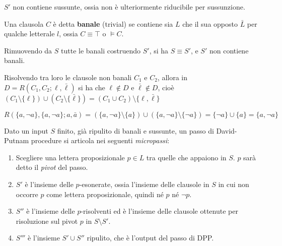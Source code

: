 \begin{oss}
        $S'$ non contiene sussunte, ossia non è ulteriormente riducibile 
        per sussunzione.
\end{oss}

\begin{defi}
        Una clausola $C$ è detta \textbf{banale} (trivial) se contiene 
        sia $L$ che  il sua opposto $\bar{L}$ per qualche letterale 
        $l$, ossia $C \equiv \top$ o $\models C$. 
\end{defi}

\begin{defi}
        Rimuovendo da $S$ tutte le banali costruendo $S'$, 
        si ha $S \equiv S'$, e $S'$ non contiene banali.
\end{defi}

\begin{oss}
        Risolvendo tra loro le clausole non banali $C_1$ e $C_2$, 
        allora in $D = R(C_1, C_2; \ell, \bar{\ell})$ si ha 
        che $\ell \notin D$ e $\bar{\ell} \notin D$, 
        cioè $(C_1 \setminus \{\ell\}) \cup (C_2 \setminus \{ \bar{\ell}\}) = (C_1 \cup C_2) \setminus \{\ell, \bar{\ell}\}$
\end{oss}

\begin{oss}
        $R(\{a, \neg a\}, \{a, \neg a\}; a, \bar{a}) = ( \{a, \neg a\} \setminus \{a\}) \cup (\{a, \neg a\} \setminus \{\neg a\}) = \{\neg a\} \cup \{a\} = \{a, \neg a\}$
\end{oss}


\begin{defi}
        Dato un  input $S$ finito, già ripulito di banali e sussunte, 
        un passo di David-Putnam procedure 
        si articola nei seguenti \textit{micropassi}: 
        \begin{enumerate}
                \item Scegliere una lettera proposizionale $p \in L$ 
                        tra quelle che appaiono in $S$. $p$ sarà detto 
                        il \textit{pivot} del passo.
                \item $S'$ è l'insieme delle $p$-esonerate, ossia 
                        l'insieme delle clausole in $S$ in cui non 
                        occorre $p$ come lettera proposizionale, quindi 
                        né $p$ né $\neg p$.
                \item $S''$ è l'insieme delle $p$-risolventi ed è l'insieme 
                        delle clausole ottenute per risoluzione sul pivot 
                        $p$ in $S\setminus S'$. 
                \item $S'''$ è l'insieme  $S' \cup S''$ ripulito, che è 
                        l'output del passo di DPP.
        \end{enumerate}
\end{defi}


